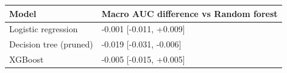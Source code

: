 \begin{tabular}{ll}
\toprule
\textbf{Model} & \textbf{Macro AUC difference vs Random forest} \\
\midrule
Logistic regression & -0.001 [-0.011, +0.009] \\
Decision tree (pruned) & -0.019 [-0.031, -0.006] \\
XGBoost & -0.005 [-0.015, +0.005] \\
\bottomrule
\end{tabular}
